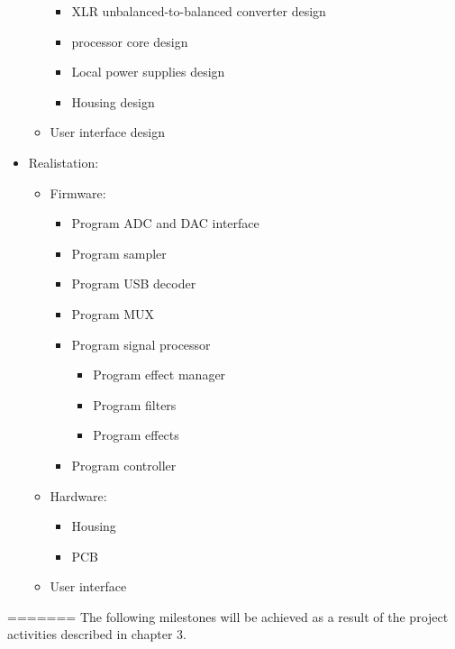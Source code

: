 \begin{itemize}
\begin{itemize}
\begin{itemize}
            \item XLR unbalanced-to-balanced converter design
            \item processor core design
            \item Local power supplies design
            \item Housing design
        \end{itemize}
        \item User interface design
    \end{itemize}
    \item Realistation:
    \begin{itemize}
        \setlength\itemsep{-0.2em}
        \item Firmware:
        \begin{itemize}
            \setlength\itemsep{-0.2em}
            \item Program ADC and DAC interface
            \item Program sampler
            \item Program USB decoder
            \item Program MUX
            \item Program signal processor
            \begin{itemize}
                \setlength\itemsep{-0.2em}
                \item Program effect manager
                \item Program filters
                \item Program effects
            \end{itemize}
            \item Program controller
        \end{itemize}
        \item Hardware:
        \begin{itemize}
            \setlength\itemsep{-0.2em}
            \item Housing
            \item PCB
        \end{itemize}
        \item User interface
    \end{itemize}
\end{itemize}
=======
The following milestones will be achieved as a result of the project activities described in chapter 3.\\

